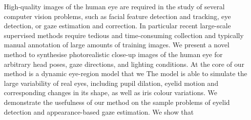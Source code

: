 
High-quality images of the human eye are required in the study of several computer vision problems, such as facial feature detection and tracking, eye detection, or gaze estimation and correction.
In particular recent large-scale supervised methods require tedious and time-consuming collection and typically manual annotation of large amounts of training images.
We present a novel method to synthesise photorealistic close-up images of the human eye for arbitrary head poses, gaze directions, and lighting conditions.
At the core of our method is a dynamic eye-region model that we 
The model is able to simulate the large variability of real eyes, including pupil dilation, eyelid motion and corresponding changes in its shape, as well as iris colour variations.
We demonstrate the usefulness of our method on the sample problems of eyelid detection and appearance-based gaze estimation.
We show that 